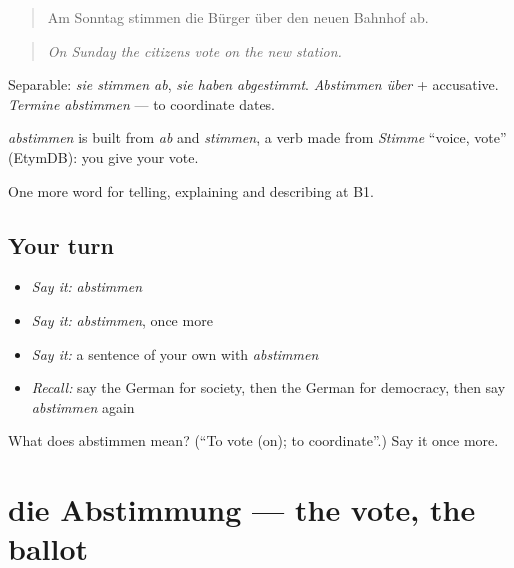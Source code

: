 \begin{quote}
Am Sonntag stimmen die Bürger über den neuen Bahnhof ab.
\end{quote}

\begin{quote}
\emph{On Sunday the citizens vote on the new station.}
\end{quote}

Separable: \emph{sie stimmen ab}, \emph{sie haben abgestimmt}. \emph{Abstimmen über} + accusative. \emph{Termine abstimmen} — to coordinate dates.

\begin{cousinweb}
\emph{abstimmen} is built from \emph{ab} and \emph{stimmen}, a verb made from \emph{Stimme} \textquotedblleft{}voice, vote\textquotedblright{} (EtymDB): you give your vote.
\end{cousinweb}

\begin{grammarlens}[title={What you've built}]
One more word for telling, explaining and describing at B1.
\end{grammarlens}

\subsection*{Your turn}
\begin{itemize}
\raggedright
  \item \emph{Say it:} \emph{abstimmen}
  \item \emph{Say it:} \emph{abstimmen}, once more
  \item \emph{Say it:} a sentence of your own with \emph{abstimmen}
  \item \emph{Recall:} say the German for society, then the German for democracy, then say \emph{abstimmen} again
\end{itemize}

\begin{tcolorbox}[breakable,colback=teal!4,colframe=teal!35!black,title={Before you move on}]
What does abstimmen mean? (\textquotedblleft{}To vote (on); to coordinate\textquotedblright{}.) Say it once more.
\end{tcolorbox}
\section[die Abstimmung]{die Abstimmung — the vote, the ballot}

\label{lesson:GE-C358-abstimmung}



